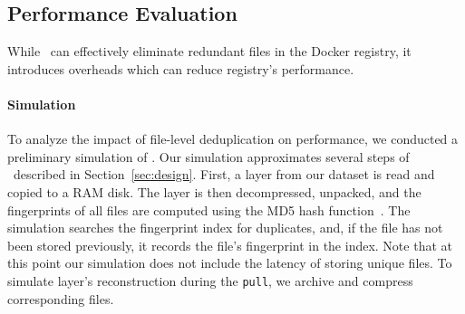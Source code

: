 \subsection{Performance Evaluation}

While \sysname\ can effectively eliminate redundant files in the
Docker registry, it introduces overheads which can reduce registry's
performance.
%



\paragraph{Simulation}
%
To analyze the impact of file-level deduplication on performance,
we conducted a preliminary simulation of \sysname.
%
%
%
%
%
Our simulation
approximates several steps of \sysname\ described in Section~\ref{sec:design}.
%
First, a layer from our dataset is read and copied to a RAM disk. 
%
%
%
The layer is then decompressed, unpacked, and the fingerprints of all files
are computed using the MD5 hash function~\cite{MD5}.
%
The simulation searches the fingerprint index for duplicates,
and, if the file has not been stored previously, it records the
file's fingerprint in the index.
%
%
%
%
%
Note that at this point our simulation does not include
the latency of storing unique files.
%
To simulate layer's reconstruction during the \texttt{pull},
we archive and compress corresponding files.
%
%

